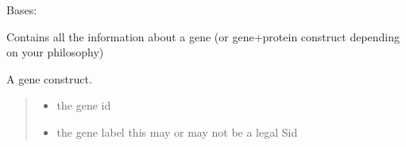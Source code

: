 \documentclass[letterpaper,12pt,english]{sphinxmanual}
\begin{document}
\begin{fulllineitems}
\label{\detokenize{api/core:cbmpy.CBModel.Gene}}
\pysigstartsignatures
\pysiglinewithargsret
{}
{\sphinxparamcomma {}\sphinxparamcomma {}}
{}
\pysigstopsignatures
\sphinxAtStartPar
Bases: {\hyperref[\detokenize{api/core:cbmpy.CBModel.Fbase}]{}}

\sphinxAtStartPar
Contains all the information about a gene (or gene+protein construct depending on
your philosophy)

\begin{fulllineitems}
\label{\detokenize{api/core:cbmpy.CBModel.Gene.label}}
\pysigstartsignatures
\pysigline
{}
\pysigstopsignatures
\end{fulllineitems}


\begin{fulllineitems}
\label{\detokenize{api/core:cbmpy.CBModel.Gene.__init__}}
\pysigstartsignatures
\pysiglinewithargsret
{}
{\sphinxparamcomma {}\sphinxparamcomma {}}
{}
\pysigstopsignatures
\sphinxAtStartPar
A gene construct.
\begin{quote}\begin{description}
\begin{itemize}
\item {} 
\sphinxAtStartPar
{} \textendash{} the gene id

\item {} 
\sphinxAtStartPar
{} \textendash{} the gene label this may or may not be a legal Sid


\end{itemize}
\end{description}
\end{quote}
\end{fulllineitems}
\end{fulllineitems}
\end{document}
